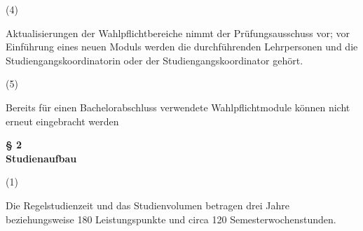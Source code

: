\documentclass{article}\usepackage{helvet}\renewcommand{\familydefault}{\sfdefault}\usepackage[letterpaper,top=2cm,bottom=2cm,left=3cm,right=3cm,marginparwidth=1.75cm]{geometry}\usepackage[colorlinks=true,allcolors=red]{hyperref}\usepackage{enumitem}\usepackage{tabularx}\usepackage[T1]{fontenc}\setlist[enumerate,1]{label=\arabic*., left=0pt}\setlist[enumerate,2]{label=\alph*., left=0.5em}\setlist[enumerate,3]{label=\alph*\alph*., left=1em}\setlist[enumerate,4]{label=-, left=1.5em}\setlist{nosep}\setlength{\parindent}{0pt}
\begin{document}
\medski

	\begin{minipage}[t]
		{2em}
		(4)
	\end{minipage}
\hspace{0.5em}
	\begin{minipage}[t]
		{\dimexpr\linewidth-2em-0.5em\relax}
		Aktualisierungen der Wahlpflichtbereiche nimmt der Prüfungsausschuss vor; vor Einführung eines neuen Moduls werden die durchführenden Lehrpersonen und die Studiengangskoordinatorin oder der Studiengangskoordinator gehört.
	\end{minipage}

\medski

	\begin{minipage}[t]
		{2em}
		(5)
	\end{minipage}
\hspace{0.5em}
	\begin{minipage}[t]
		{\dimexpr\linewidth-2em-0.5em\relax}
		Bereits für einen Bachelorabschluss verwendete Wahlpflichtmodule können nicht erneut eingebracht werden
	\end{minipage}

\medski

	\begin{center}
		\textbf{§ 2\\Studienaufbau}
	\end{center}

	\begin{minipage}[t]
		{2em}
		(1)
	\end{minipage}
\hspace{0.5em}
	\begin{minipage}[t]
		{\dimexpr\linewidth-2em-0.5em\relax}
		Die Regelstudienzeit und das Studienvolumen betragen drei Jahre beziehungsweise 180 Leistungspunkte und circa 120 Semesterwochenstunden.
	\end{minipage}

\medski
\end{document}
